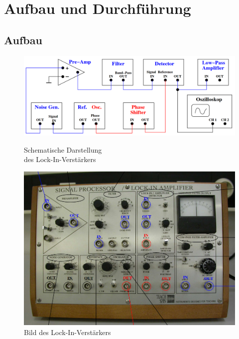 \section{Aufbau und Durchführung}

\subsection{Aufbau}
\label{sec:Aufbau}

\begin{figure}
    \begin{minipage}[b]{.4\linewidth} %
       \includegraphics[width=\linewidth]{img/Schema.png}
       \caption{Schematische Darstellung\\ des Lock-In-Verstärkers}
    \end{minipage}
    \hspace{.1\linewidth}%
    \begin{minipage}[b]{.4\linewidth} %
       \includegraphics[width=\linewidth]{img/BildLockIn.png}
       \caption{Bild des Lock-In-Verstärkers}
    \end{minipage}
 \end{figure}


